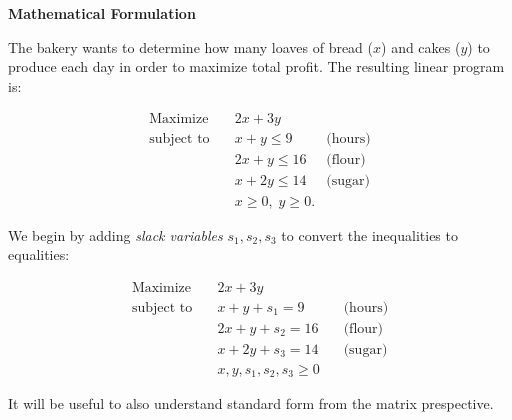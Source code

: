 \textbf{Mathematical Formulation}

The bakery wants to determine how many loaves of bread (\(x\)) and cakes (\(y\)) to produce each day in order to maximize total profit. The resulting linear program is:

\begin{tcolorbox}[colback=orange!5!white, colframe=orange!75!black,    
    width=0.6\textwidth, %
    box align=center, 
    title=\textbf{Original Linear Program}]
\[
\begin{aligned}
\text{Maximize} \quad & 2x + 3y \\
\text{subject to} \quad 
& x + y \leq 9  & \text{(hours)}\\
& 2x + y \leq 16  & \text{(flour)}\\
& x + 2y \leq 14 & \text{(sugar)}\\
& x \geq 0,\; y \geq 0.
\end{aligned}
\]
\end{tcolorbox}

We begin by adding \emph{slack variables} \( s_1, s_2, s_3 \) to convert the inequalities to equalities:

\begin{tcolorbox}[colback=gray!5!white, colframe=gray!75!black,    
    width=0.6\textwidth, %
    box align=center, 
    title=\textbf{Standard Form}]
\[
\begin{aligned}
\text{Maximize} \quad & 2x + 3y \\
\text{subject to} \quad 
&x + y + s_1 = 9 \quad &\text{(hours)} \\
&2x + y + s_2 = 16 \quad &\text{(flour)} \\
&x + 2y + s_3 = 14 \quad &\text{(sugar)} \\
&x, y, s_1, s_2, s_3 \geq 0
\end{aligned}
\]
\end{tcolorbox}

It will be useful to also understand standard form from the matrix prespective.


